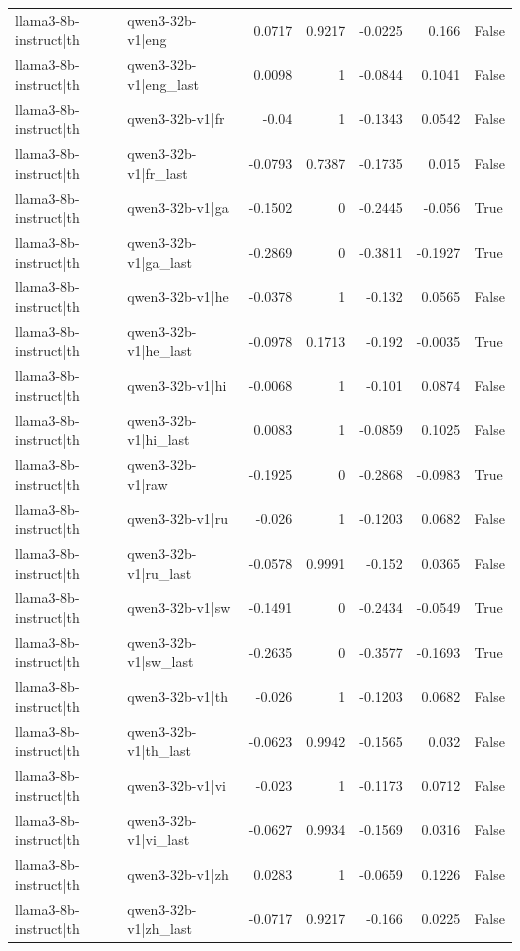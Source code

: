 \begin{table}
\begin{tabular}{l l r r r r l}
llama3-8b-instruct|th & qwen3-32b-v1|eng & 0.0717 & 0.9217 & -0.0225 & 0.166 & False \\
llama3-8b-instruct|th & qwen3-32b-v1|eng_last & 0.0098 & 1 & -0.0844 & 0.1041 & False \\
llama3-8b-instruct|th & qwen3-32b-v1|fr & -0.04 & 1 & -0.1343 & 0.0542 & False \\
llama3-8b-instruct|th & qwen3-32b-v1|fr_last & -0.0793 & 0.7387 & -0.1735 & 0.015 & False \\
llama3-8b-instruct|th & qwen3-32b-v1|ga & -0.1502 & 0 & -0.2445 & -0.056 & True \\
llama3-8b-instruct|th & qwen3-32b-v1|ga_last & -0.2869 & 0 & -0.3811 & -0.1927 & True \\
llama3-8b-instruct|th & qwen3-32b-v1|he & -0.0378 & 1 & -0.132 & 0.0565 & False \\
llama3-8b-instruct|th & qwen3-32b-v1|he_last & -0.0978 & 0.1713 & -0.192 & -0.0035 & True \\
llama3-8b-instruct|th & qwen3-32b-v1|hi & -0.0068 & 1 & -0.101 & 0.0874 & False \\
llama3-8b-instruct|th & qwen3-32b-v1|hi_last & 0.0083 & 1 & -0.0859 & 0.1025 & False \\
llama3-8b-instruct|th & qwen3-32b-v1|raw & -0.1925 & 0 & -0.2868 & -0.0983 & True \\
llama3-8b-instruct|th & qwen3-32b-v1|ru & -0.026 & 1 & -0.1203 & 0.0682 & False \\
llama3-8b-instruct|th & qwen3-32b-v1|ru_last & -0.0578 & 0.9991 & -0.152 & 0.0365 & False \\
llama3-8b-instruct|th & qwen3-32b-v1|sw & -0.1491 & 0 & -0.2434 & -0.0549 & True \\
llama3-8b-instruct|th & qwen3-32b-v1|sw_last & -0.2635 & 0 & -0.3577 & -0.1693 & True \\
llama3-8b-instruct|th & qwen3-32b-v1|th & -0.026 & 1 & -0.1203 & 0.0682 & False \\
llama3-8b-instruct|th & qwen3-32b-v1|th_last & -0.0623 & 0.9942 & -0.1565 & 0.032 & False \\
llama3-8b-instruct|th & qwen3-32b-v1|vi & -0.023 & 1 & -0.1173 & 0.0712 & False \\
llama3-8b-instruct|th & qwen3-32b-v1|vi_last & -0.0627 & 0.9934 & -0.1569 & 0.0316 & False \\
llama3-8b-instruct|th & qwen3-32b-v1|zh & 0.0283 & 1 & -0.0659 & 0.1226 & False \\
llama3-8b-instruct|th & qwen3-32b-v1|zh_last & -0.0717 & 0.9217 & -0.166 & 0.0225 & False \\

\end{tabular}
\end{table}
